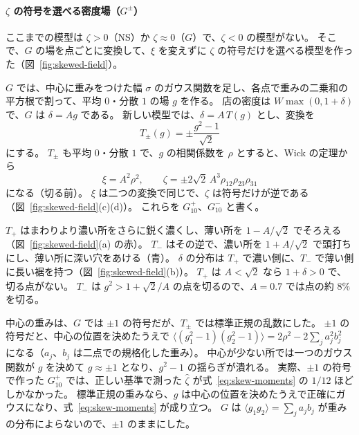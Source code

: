 \documentclass[a4paper,11pt]{ltjsarticle}
\begin{document}
\paragraph{$\zeta$ の符号を選べる密度場（$G^{\pm}$）}
\label{sec:skewed-field}
ここまでの模型は $\zeta > 0$（NS）か $\zeta \approx 0$（$G$）で、$\zeta < 0$ の模型がない。
そこで、$G$ の場を点ごとに変換して、$\xi$ を変えずに $\zeta$ の符号だけを選べる模型を作った（図~\ref{fig:skewed-field}）。

$G$ では、中心に重みをつけた幅 $\sigma$ のガウス関数を足し、各点で重みの二乗和の平方根で割って、平均 $0$・分散 $1$ の場 $g$ を作る。
店の密度は $W \max(0, 1 + \delta)$ で、$G$ は $\delta = A g$ である。
新しい模型では、$\delta = A\,T(g)$ とし、変換を
\begin{equation}
  T_\pm(g) = \pm\frac{g^2 - 1}{\sqrt{2}}
  \label{eq:skew-transform}
\end{equation}
にする。
$T_\pm$ も平均 $0$・分散 $1$ で、$g$ の相関係数を $\rho$ とすると、Wick の定理から
\begin{equation}
  \xi = A^2 \rho^2, \qquad
  \zeta = \pm 2\sqrt{2}\, A^3 \rho_{12}\rho_{23}\rho_{31}
  \label{eq:skew-moments}
\end{equation}
になる（切る前）。
$\xi$ は二つの変換で同じで、$\zeta$ は符号だけが逆である（図~\ref{fig:skewed-field}(c)(d)）。
これらを $G_{10}^{+}$、$G_{10}^{-}$ と書く。

$T_+$ はまわりより濃い所をさらに鋭く濃くし、薄い所を $1 - A/\sqrt{2}$ でそろえる（図~\ref{fig:skewed-field}(a) の赤）。
$T_-$ はその逆で、濃い所を $1 + A/\sqrt{2}$ で頭打ちにし、薄い所に深い穴をあける（青）。
$\delta$ の分布は $T_+$ で濃い側に、$T_-$ で薄い側に長い裾を持つ（図~\ref{fig:skewed-field}(b)）。
$T_+$ は $A < \sqrt{2}$ なら $1 + \delta > 0$ で、切る点がない。
$T_-$ は $g^2 > 1 + \sqrt{2}/A$ の点を切るので、$A = 0.7$ では点の約 $8\%$ を切る。

中心の重みは、$G$ では $\pm 1$ の符号だが、$T_\pm$ では標準正規の乱数にした。
$\pm 1$ の符号だと、中心の位置を決めたうえで $\langle (g_1^2 - 1)(g_2^2 - 1)\rangle = 2\rho^2 - 2\sum_j a_j^2 b_j^2$ になる（$a_j$、$b_j$ は二点での規格化した重み）。
中心が少ない所では一つのガウス関数が $g$ を決めて $g \approx \pm 1$ となり、$g^2 - 1$ の揺らぎが潰れる。
実際、$\pm 1$ の符号で作った $G_{10}^{+}$ では、正しい基準で測った $\hat\zeta$ が式~\eqref{eq:skew-moments} の $1/12$ ほどしかなかった。
標準正規の重みなら、$g$ は中心の位置を決めたうえで正確にガウスになり、式~\eqref{eq:skew-moments} が成り立つ。
$G$ は $\langle g_1 g_2\rangle = \sum_j a_j b_j$ が重みの分布によらないので、$\pm 1$ のままにした。
\end{document}
